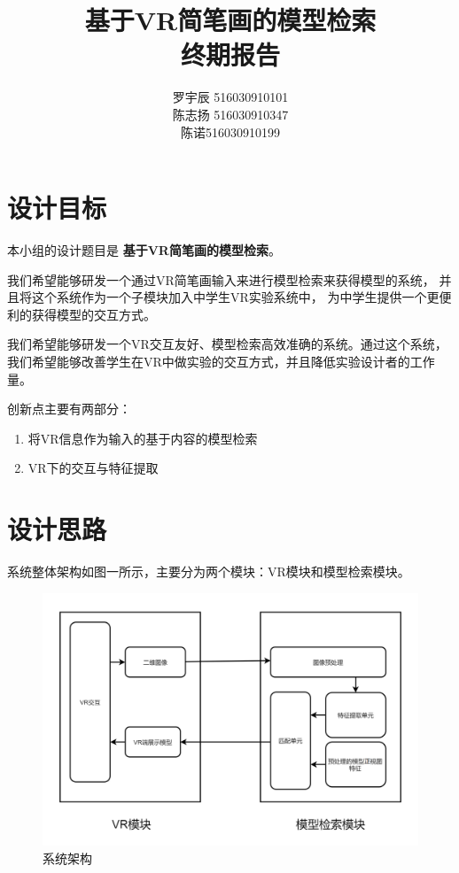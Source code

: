 \documentclass{article}
\title{基于VR简笔画的模型检索 \\ 终期报告}
\author{
罗宇辰 516030910101 \\
陈志扬 516030910347 \\
陈\quad 诺516030910199
}
\begin{document}
\maketitle
\tableofcontents

\clearpage
\newpage


\section{设计目标}
本小组的设计题目是 \textbf{基于VR简笔画的模型检索}。

我们希望能够研发一个通过VR简笔画输入来进行模型检索来获得模型的系统，
并且将这个系统作为一个子模块加入中学生VR实验系统中，
为中学生提供一个更便利的获得模型的交互方式。

我们希望能够研发一个VR交互友好、模型检索高效准确的系统。通过这个系统，我们希望能够改善学生在VR中做实验的交互方式，并且降低实验设计者的工作量。 

创新点主要有两部分：
\begin{enumerate}
    \item 将VR信息作为输入的基于内容的模型检索
    \item VR下的交互与特征提取
\end{enumerate}

\section{设计思路}
系统整体架构如图一所示，主要分为两个模块：VR模块和模型检索模块。

\begin{figure}[htb]
\centering
\includegraphics[width=1\textwidth]{images/architecture.png}
\caption{系统架构}\label{fig:digit}
\end{figure} 
\end{document}
